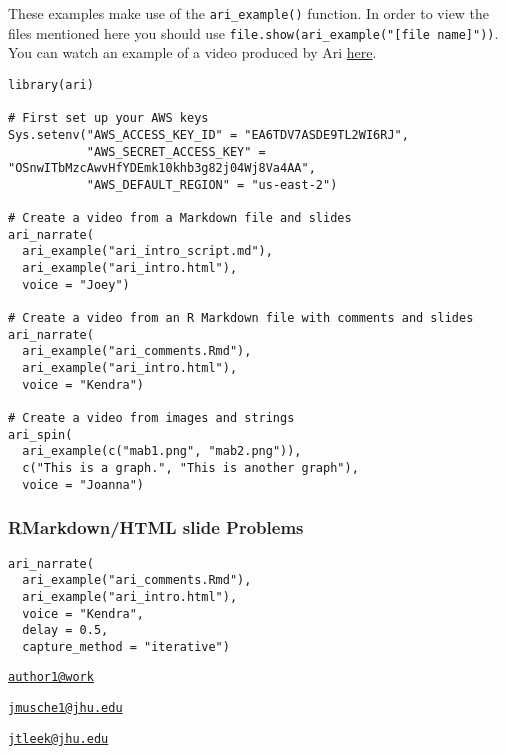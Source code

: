These examples make use of the \texttt{ari\_example()} function. In
order to view the files mentioned here you should use
\texttt{file.show(ari\_example("{[}file\ name{]}"))}. You can watch an
example of a video produced by Ari
\href{https://youtu.be/dcIUu4GCOKU}{here}.

\begin{verbatim}
library(ari)

# First set up your AWS keys
Sys.setenv("AWS_ACCESS_KEY_ID" = "EA6TDV7ASDE9TL2WI6RJ",
           "AWS_SECRET_ACCESS_KEY" = "OSnwITbMzcAwvHfYDEmk10khb3g82j04Wj8Va4AA",
           "AWS_DEFAULT_REGION" = "us-east-2")

# Create a video from a Markdown file and slides
ari_narrate(
  ari_example("ari_intro_script.md"),
  ari_example("ari_intro.html"),
  voice = "Joey")

# Create a video from an R Markdown file with comments and slides
ari_narrate(
  ari_example("ari_comments.Rmd"),
  ari_example("ari_intro.html"),
  voice = "Kendra")

# Create a video from images and strings
ari_spin(
  ari_example(c("mab1.png", "mab2.png")),
  c("This is a graph.", "This is another graph"),
  voice = "Joanna")
\end{verbatim}

\hypertarget{rmarkdownhtml-slide-problems}{%
\subsubsection{RMarkdown/HTML slide
Problems}\label{rmarkdownhtml-slide-problems}}

\begin{verbatim}
ari_narrate(
  ari_example("ari_comments.Rmd"),
  ari_example("ari_intro.html"),
  voice = "Kendra",
  delay = 0.5,
  capture_method = "iterative")
\end{verbatim}





\address{%
Sean Kross\\
Cognitive Science, University of California, San Diego\\
9500 Gilman Dr.\\ La Jolla, CA 92093\\
}
\href{mailto:author1@work}{\nolinkurl{author1@work}}

\address{%
John Muschelli\\
Department of Biostatistics, Johns Hopkins Bloomberg School of Public
Health\\
615 N Wolfe Street\\ Baltimore, MD 21231\\
}
\href{mailto:jmusche1@jhu.edu}{\nolinkurl{jmusche1@jhu.edu}}

\address{%
Jeffrey T. Leek\\
Department of Biostatistics, Johns Hopkins Bloomberg School of Public
Health\\
615 N Wolfe Street\\ Baltimore, MD 21231\\
}
\href{mailto:jtleek@jhu.edu}{\nolinkurl{jtleek@jhu.edu}}

